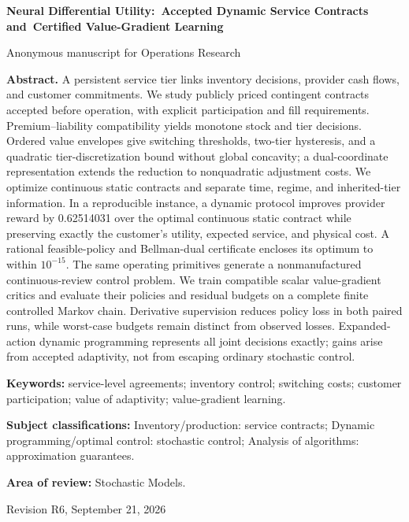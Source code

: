 \documentclass[11pt,letterpaper]{article}
\theoremstyle{definition}
\newcommand{\1}{\mathbf 1}
\begin{document}
\begin{titlepage}
\centering
{\Large\bfseries Neural Differential Utility:\ Accepted Dynamic Service Contracts and\ Certified Value-Gradient Learning\par}
\vspace{0.3in}
{Anonymous manuscript for Operations Research\par}
\vspace{0.25in}
\begin{minipage}{\textwidth}
\textbf{Abstract.}
A persistent service tier links inventory decisions, provider cash flows, and customer commitments. We study publicly priced contingent contracts accepted before operation, with explicit participation and fill requirements. Premium--liability compatibility yields monotone stock and tier decisions. Ordered value envelopes give switching thresholds, two-tier hysteresis, and a quadratic tier-discretization bound without global concavity; a dual-coordinate representation extends the reduction to nonquadratic adjustment costs. We optimize continuous static contracts and separate time, regime, and inherited-tier information. In a reproducible instance, a dynamic protocol improves provider reward by 0.62514031 over the optimal continuous static contract while preserving exactly the customer's utility, expected service, and physical cost. A rational feasible-policy and Bellman-dual certificate encloses its optimum to within $10^{-15}$. The same operating primitives generate a nonmanufactured continuous-review control problem. We train compatible scalar value-gradient critics and evaluate their policies and residual budgets on a complete finite controlled Markov chain. Derivative supervision reduces policy loss in both paired runs, while worst-case budgets remain distinct from observed losses. Expanded-action dynamic programming represents all joint decisions exactly; gains arise from accepted adaptivity, not from escaping ordinary stochastic control.
\par\vspace{0.18in}
\textbf{Keywords:} service-level agreements; inventory control; switching costs; customer participation; value of adaptivity; value-gradient learning.
\par\vspace{0.12in}
\textbf{Subject classifications:} Inventory/production: service contracts; Dynamic programming/optimal control: stochastic control; Analysis of algorithms: approximation guarantees.
\par\vspace{0.12in}
\textbf{Area of review:} Stochastic Models.
\end{minipage}
\vfill
{Revision R6, September 21, 2026\par}
\end{titlepage}
\end{document}
